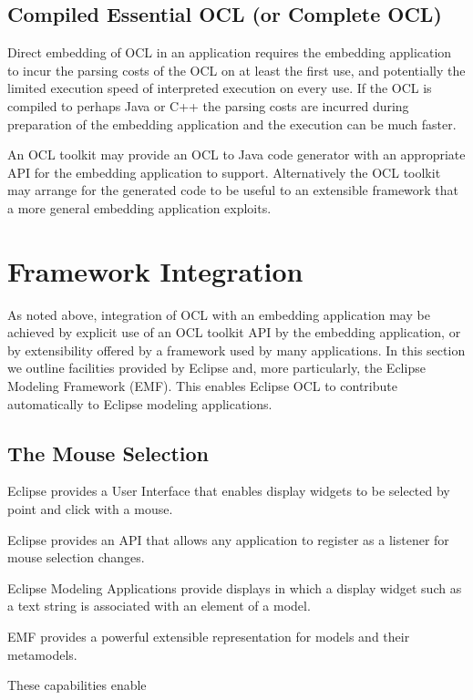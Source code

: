 \documentclass[a4paper]{article}
\begin{document}
\subsection{Compiled Essential OCL (or Complete OCL)}

Direct embedding of OCL in an application requires the embedding application to incur the parsing costs of the OCL on at least the first use, and potentially the limited execution speed of interpreted execution on every use. If the OCL is compiled to perhaps Java or C++ the parsing costs are incurred during preparation of the embedding application and the execution can be much faster.

An OCL toolkit may provide an OCL to Java code generator with an appropriate API for the embedding application to support. Alternatively the OCL toolkit may arrange for the generated code to be useful to an extensible framework that a more general embedding application exploits.

\section{Framework Integration}\label{Framework-Integration}

As noted above, integration of OCL with an embedding application may be achieved by explicit use of an OCL toolkit API by the embedding application, or by extensibility offered by a framework used by many applications. In this section we outline facilities provided by Eclipse and, more particularly, the Eclipse Modeling Framework (EMF). This enables Eclipse OCL to contribute automatically  to Eclipse modeling applications.

\subsection{The Mouse Selection}

Eclipse provides a User Interface that enables display widgets to be selected by point and click with a mouse.

Eclipse provides an API that allows any application to register as a listener for mouse selection changes.

Eclipse Modeling Applications provide displays in which a display widget such as a text string is associated with an element of a model.

EMF provides a powerful extensible representation for models and their metamodels.

These capabilities enable
\end{document}
